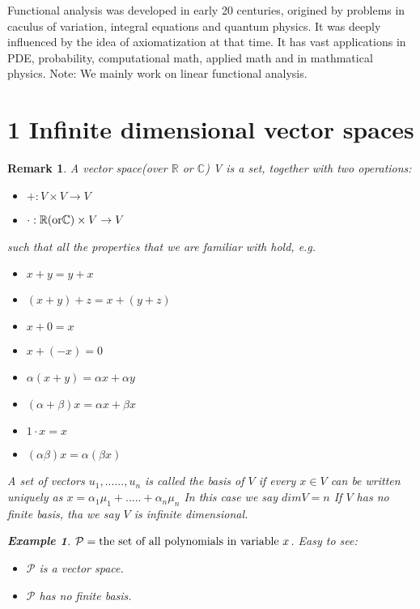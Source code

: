 \documentclass{article}
\newtheorem*{remark}{Remark}
\newtheorem*{example}{Example}
\begin{document}
Functional analysis was developed in early 20 centuries, 
origined by problems in caculus of variation, 
integral equations and quantum physics. 
It was deeply influenced by the idea of axiomatization at that time.
It has vast applications in PDE, probability, computational math, applied math and in mathmatical physics.
Note: We mainly work on linear functional analysis.

\section*{1 Infinite dimensional vector spaces}
\begin{remark}
    A vector space(over $\mathbb{R}$ or $\mathbb{C}$) V is a set, together with two operations:
    \begin{itemize}
        \item $+: V \times V \rightarrow V$
        \item $\cdot:\mathbb{R}(\textnormal{or} \mathbb{C}) \times V \rightarrow V$
    \end{itemize}
    such that all the properties that we are familiar with hold, e.g.
    \begin{itemize}
        \item $x + y = y + x$
        \item $(x + y) + z = x + (y + z)$
        \item $x + 0 = x$
        \item $x + (-x) = 0$
        \item $\alpha(x + y) = \alpha x + \alpha y$
        \item $(\alpha + \beta)x = \alpha x + \beta x$
        \item $1 \cdot x = x$
        \item $(\alpha \beta)x = \alpha(\beta x)$
    \end{itemize}
    A set of vectors ${u_1, ......, u_n}$ is called the basis of $V$ 
    if every $x \in V$ can be written uniquely as 
    $x = \alpha_1\mu_1 + ..... + \alpha_n\mu_n$
    In this case we say $dimV = n$
    If $V$ has no finite basis, tha we say $V$ is infinite dimensional.
    \begin{example}
        $\mathcal{P} = \textnormal{the set of all polynomials in variable } x$.
        Easy to see:
        \begin{itemize}
            \item $\mathcal{P}$ is a vector space.
            \item $\mathcal{P}$ has no finite basis.

\end{itemize}
\end{example}
\end{remark}
\end{document}
